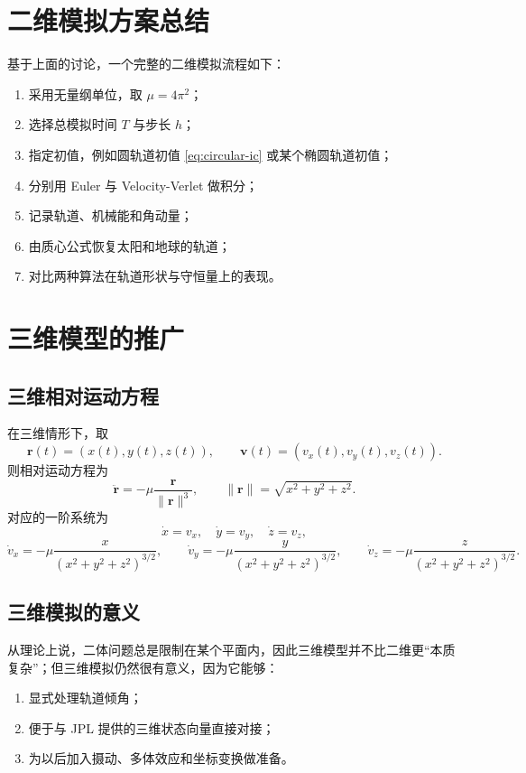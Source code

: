 \documentclass[12pt,a4paper]{ctexrep}
\begin{document}
\section{二维模拟方案总结}

基于上面的讨论，一个完整的二维模拟流程如下：
\begin{enumerate}[label=\arabic*.]
  \item 采用无量纲单位，取 \(\mu=4\pi^2\)；
  \item 选择总模拟时间 \(T\) 与步长 \(h\)；
  \item 指定初值，例如圆轨道初值 \eqref{eq:circular-ic} 或某个椭圆轨道初值；
  \item 分别用 Euler 与 Velocity-Verlet 做积分；
  \item 记录轨道、机械能和角动量；
  \item 由质心公式恢复太阳和地球的轨道；
  \item 对比两种算法在轨道形状与守恒量上的表现。
\end{enumerate}

\section{三维模型的推广}

\subsection{三维相对运动方程}

在三维情形下，取
\[
\bm r(t)=(x(t),y(t),z(t)),
\qquad
\bm v(t)=(v_x(t),v_y(t),v_z(t)).
\]
则相对运动方程为
\[
\ddot{\bm r}=-\mu \frac{\bm r}{\|\bm r\|^3},
\qquad
\|\bm r\|=\sqrt{x^2+y^2+z^2}.
\]
对应的一阶系统为
\[
\dot x=v_x,\quad \dot y=v_y,\quad \dot z=v_z,
\]
\[
\dot v_x=-\mu \frac{x}{(x^2+y^2+z^2)^{3/2}},\qquad
\dot v_y=-\mu \frac{y}{(x^2+y^2+z^2)^{3/2}},\qquad
\dot v_z=-\mu \frac{z}{(x^2+y^2+z^2)^{3/2}}.
\]

\subsection{三维模拟的意义}

从理论上说，二体问题总是限制在某个平面内，因此三维模型并不比二维更“本质复杂”；但三维模拟仍然很有意义，因为它能够：
\begin{enumerate}[label=\arabic*.]
  \item 显式处理轨道倾角；
  \item 便于与 JPL 提供的三维状态向量直接对接；
  \item 为以后加入摄动、多体效应和坐标变换做准备。
\end{enumerate}
\end{document}
